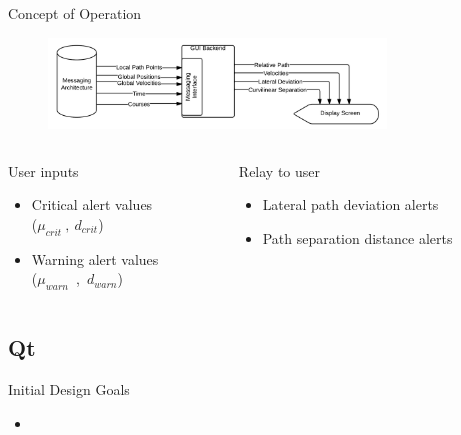 \documentclass{beamer}
\begin{document}
  \begin{frame}{Concept of Operation}
    \begin{figure}
      \includegraphics[width=0.8\textwidth]{../graphics/blackbox_flowchart.png}
    \end{figure}
    \begin{columns}  
      \begin{column}{0.5\textwidth}
        \footnotesize User inputs
        \begin{itemize} \footnotesize
          \item Critical alert values\\ ($\mu_{crit}~,~d_{crit}$)
          \item Warning alert values\\ ($\mu_{warn}$~,~$d_{warn}$)
        \end{itemize}
      \end{column}
      \begin{column}{0.5\textwidth}
        \footnotesize Relay to user
        \begin{itemize} \footnotesize
          \item Lateral path deviation alerts
          \item Path separation distance alerts
        \end{itemize}
      \end{column}
    \end{columns}
  \end{frame}


  \subsection{Qt}

    \begin{frame}{Initial Design Goals}
      \begin{itemize}
        \item
      \end{itemize}
    \end{frame}
\end{document}

